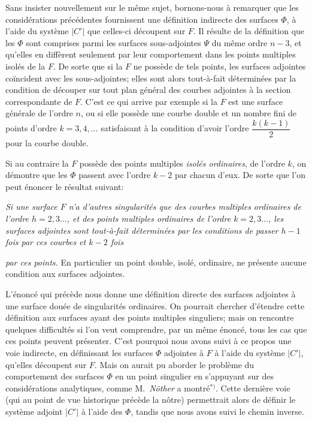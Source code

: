 \documentclass{article}
\begin{document}
Sans insister nouvellement sur le même sujet, bornons-nous à remarquer que les considérations précédentes fournissent une définition indirecte des surfaces $\Phi$, à l'aide du système $|C'|$ que celles-ci découpent sur $F$. Il résulte de la définition que les $\Phi$ sont comprises parmi les surfaces sous-adjointes $\Psi$ du même ordre $n - 3$, et qu'elles en diffèrent seulement par leur comportement dans les points multiples isolés de la $F$. De sorte que si la $F$ ne possède de tels points, les surfaces adjointes coïncident avec les sous-adjointes; elles sont alors tout-à-fait déterminées par la condition de découper sur tout plan général des courbes adjointes à la section correspondante de $F$. C'est ce qui arrive par exemple si la $F$ est une surface générale de l'ordre $n$, ou si elle possède une courbe double et un nombre fini de points d'ordre $k = 3, 4, \ldots$ satisfaisant à la condition d'avoir l'ordre $\dfrac{k(k-1)}{2}$ pour la courbe double.

Si au contraire la $F$ possède des points multiples \emph{isolés ordinaires}, de l'ordre $k$, on démontre que les $\Phi$ passent avec l'ordre $k - 2$ par chacun d'eux. De sorte que l'on peut énoncer le résultat suivant:

\emph{Si une surface $F$ n'a d'autres singularités que des courbes multiples ordinaires de l'ordre $h = 2, 3 \ldots$, et des points multiples ordinaires de l'ordre $k = 2, 3 \ldots$, les surfaces adjointes sont tout-à-fait déterminées par les conditions de passer $h - 1$ fois par ces courbes et $k - 2$ fois}

\emph{par ces points.} En particulier un point double, isolé, ordinaire, ne présente aucune condition aux surfaces adjointes.

L'énoncé qui précède nous donne une définition directe des surfaces adjointes à une surface douée de singularités ordinaires. On pourrait chercher d'étendre cette définition aux surfaces ayant des points multiples singuliers; mais on rencontre quelques difficultés si l'on veut comprendre, par un même énoncé, tous les cas que ces points peuvent présenter. C'est pourquoi nous avons suivi à ce propos une voie indirecte, en définissant les surfaces $\Phi$ adjointes à $F$ à l'aide du système $|C'|$, qu'elles découpent sur $F$. Mais on aurait pu aborder le problème du comportement des surfaces $\Phi$ en un point singulier en s'appuyant sur des considérations analytiques, comme M.\ \emph{Nöther} a montré${}^{*)}$. Cette dernière voie (qui au point de vue historique précède la nôtre) permettrait alors de définir le système adjoint $|C'|$ à l'aide des $\Phi$, tandis que nous avons suivi le chemin inverse.
\end{document}

